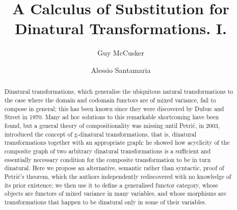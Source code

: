 \documentclass[times]{elsarticle}
\begin{document}
	
	
	
	\begin{frontmatter}
	\title{A Calculus of Substitution for Dinatural Transformations. I.}
	
	\author{Guy McCusker}
	
	\author{Alessio Santamaria}
	
    
	
	\address{Department of Computer Science, University of Bath, BA2 7AY Bath, United Kingdom}
	
	\begin{abstract}

Dinatural transformations, which generalise the ubiquitous natural transformations to the case where the domain and codomain functors are of mixed variance, fail to compose in general; this has been known since they were discovered by Dubuc and Street in 1970. Many ad hoc solutions to this remarkable shortcoming have been found, but a general theory of compositionality was missing until Petri\'c, in 2003, introduced the concept of g-dinatural transformations, that is, dinatural transformations together with an appropriate graph: he showed how acyclicity of the composite graph of two arbitrary dinatural transformations is a sufficient and essentially necessary condition for the composite transformation to be in turn dinatural. Here we propose an alternative, semantic rather than syntactic, proof of Petri\'c's theorem, which the authors independently rediscovered with no knowledge of its prior existence; we then use it to define a generalised functor category, whose objects are functors of mixed variance in many variables, and whose morphisms are transformations that happen to be dinatural only in some of their variables.


\end{abstract}
\end{frontmatter}
\end{document}
